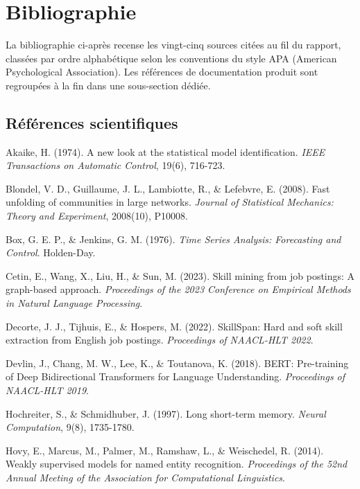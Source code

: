 \documentclass[11pt,a4paper,openany]{report}
\begin{document}
\section*{Bibliographie}

La bibliographie ci-apr\`es recense les vingt-cinq sources cit\'ees au fil du rapport, class\'ees par ordre alphab\'etique selon les conventions du style APA (American Psychological Association). Les r\'ef\'erences de documentation produit sont regroup\'ees \`a la fin dans une sous-section d\'edi\'ee.

\subsection*{R\'ef\'erences scientifiques}

\begingroup
\setlength{\parskip}{0.4em}
\setlength{\parindent}{0pt}

Akaike, H. (1974). A new look at the statistical model identification. \emph{IEEE Transactions on Automatic Control}, 19(6), 716-723.

Blondel, V. D., Guillaume, J. L., Lambiotte, R., \& Lefebvre, E. (2008). Fast unfolding of communities in large networks. \emph{Journal of Statistical Mechanics: Theory and Experiment}, 2008(10), P10008.

Box, G. E. P., \& Jenkins, G. M. (1976). \emph{Time Series Analysis: Forecasting and Control}. Holden-Day.

Cetin, E., Wang, X., Liu, H., \& Sun, M. (2023). Skill mining from job postings: A graph-based approach. \emph{Proceedings of the 2023 Conference on Empirical Methods in Natural Language Processing}.

Decorte, J. J., Tijhuis, E., \& Hospers, M. (2022). SkillSpan: Hard and soft skill extraction from English job postings. \emph{Proceedings of NAACL-HLT 2022}.

Devlin, J., Chang, M. W., Lee, K., \& Toutanova, K. (2018). BERT: Pre-training of Deep Bidirectional Transformers for Language Understanding. \emph{Proceedings of NAACL-HLT 2019}.

Hochreiter, S., \& Schmidhuber, J. (1997). Long short-term memory. \emph{Neural Computation}, 9(8), 1735-1780.

Hovy, E., Marcus, M., Palmer, M., Ramshaw, L., \& Weischedel, R. (2014). Weakly supervised models for named entity recognition. \emph{Proceedings of the 52nd Annual Meeting of the Association for Computational Linguistics}.
\end{document}
